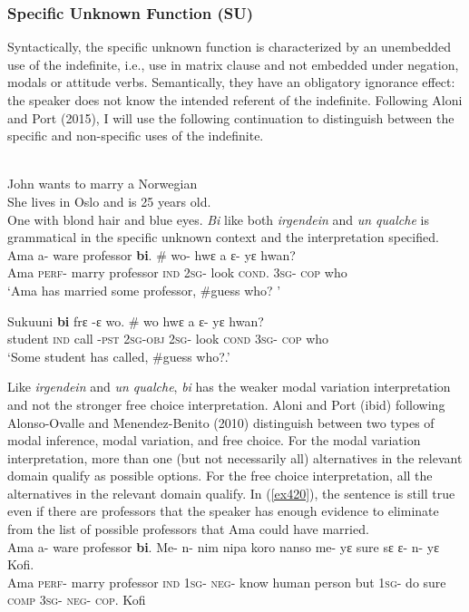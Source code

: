 \documentclass[output=paper,modfonts]{langsci/langscibook}
\begin{document}
\subsubsection{Specific Unknown Function (SU)}
Syntactically, the specific unknown function is characterized by an unembedded use of the indefinite, i.e., use in matrix clause and not embedded under negation, modals or attitude verbs. Semantically, they have an obligatory ignorance effect: the speaker does not know the intended referent of the indefinite. Following Aloni and Port (2015), I will use the following continuation to distinguish between the specific and non-specific uses of the indefinite.

\ea\label{ex40}\\
 John wants to marry a Norwegian\\
 \ea
 She lives in Oslo and is 25 years old.\\
\ex One with blond hair and blue eyes.
\z\z
\emph{Bi} like both \emph{irgendein} and \emph{un qualche} is grammatical in the specific unknown context  and the interpretation specified. 
\ea {}\\
\ea\label{ex42}
 \gll  Ama a- ware professor \textbf{bi}. \# wo- hwε a ε- yε hwan?\\
Ama \textsc{perf}- marry professor \textsc{ind} {} \textsc{2sg}- look  \textsc{cond}. \textsc{3sg}- \textsc{cop} who \\
    
\glt `Ama has married some professor, \#guess who? ' 

\ex 
\gll  Sukuuni \textbf{bi} frε -ε wo. \# wo hwε a ε- yε hwan?\\
student  \textsc{ind} call -\textsc{pst}       \textsc{2sg}-\textsc{obj} {} \textsc{2sg}- look  \textsc{cond} \textsc{3sg}- \textsc{cop} who\\
    
\glt `Some student has called, \#guess who?.' 
\z \z

Like \emph{irgendein} and \emph{un qualche}, \emph{bi} has the weaker modal variation interpretation and not the stronger free choice interpretation. Aloni and Port (ibid) following Alonso-Ovalle and Menendez-Benito (2010) distinguish between two types of modal inference, modal variation, and free choice. 
For the modal variation interpretation, more than one (but not necessarily all) alternatives in the relevant domain qualify as possible options. For the free choice interpretation, all the alternatives in the relevant domain qualify. In (\ref{ex420}), the sentence is still true even if there are professors that the speaker has enough evidence to eliminate from the list of possible professors that Ama could have married.
\ea\label{ex420}\\
 \gll  Ama a- ware professor \textbf{bi}. Me- n- nim nipa koro nanso me- yε sure sε ε- n- yε Kofi.\\
Ama \textsc{perf}- marry professor \textsc{ind} \textsc{1sg}- \textsc{neg}- know human person but \textsc{1sg}- do sure \textsc{comp}  \textsc{3sg}- \textsc{neg}- \textsc{cop}. Kofi \\
    
\end{document}
